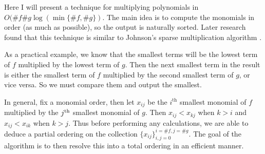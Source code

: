 Here I will present a technique for multiplying polynomials in $O(\# f \# g \log (\min\{\# f, \# g\})$. The main idea is to compute the monomials in order (as much as possible), so the output is naturally sorted. Later research found that this technique is similar to Johnson's sparse multiplication algorithm \cite{johnson-sparse-polynomial}.

As a practical example, we know that the smallest terms will be the lowest term of $f$ multiplied by the lowest term of $g$. Then the next smallest term in the result is either the smallest term of $f$ multiplied by the second smallest term of $g$, or vice versa. So we must compare them and output the smallest. 

In general, fix a monomial order, then let $x_{ij}$ be the $i^{\text{th}}$ smallest monomial of $f$ multiplied by the $j^{\textrm{th}}$ smallest monomial of $g$. Then $x_{ij} < x_{kj}$ when $k > i$ and $x_{ij} < x_{ik}$ when $k > j$. Thus before performing any calculations, we are able to deduce a partial ordering on the collection $\{x_{ij}\}_{i, j=0}^{i=\# f, j = \#g}$. The goal of the algorithm is to then resolve this into a total ordering in an efficient manner.

\begin{figure}
    \center
\end{figure}


